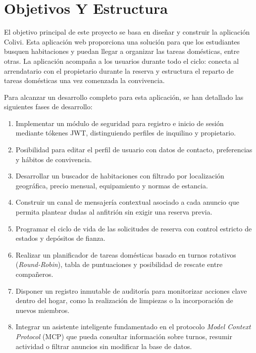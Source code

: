\section{Objetivos Y Estructura}
\label{Objetivos Y Estructura}

    El objetivo principal de este proyecto se basa en diseñar y construir la aplicación Colivi. Esta aplicación web proporciona una solución para que los estudiantes busquen habitaciones y puedan llegar a organizar las tareas domésticas, entre otras. La aplicación acompaña a los usuarios durante todo el ciclo: conecta al arrendatario con el propietario durante la reserva y estructura el reparto de tareas domésticas una vez comenzada la convivencia.
    
    Para alcanzar un desarrollo completo para esta aplicación, se han detallado las siguientes fases de desarrollo: 

\begin{enumerate}
    \item Implementar un módulo de seguridad para registro e inicio de sesión mediante tókenes JWT, distinguiendo perfiles de inquilino y propietario.
    \item Posibilidad para editar el perfil de usuario con datos de contacto, preferencias y hábitos de convivencia.
    \item Desarrollar un buscador de habitaciones con filtrado por localización geográfica, precio mensual, equipamiento y normas de estancia.
    \item Construir un canal de mensajería contextual asociado a cada anuncio que permita plantear dudas al anfitrión sin exigir una reserva previa.
    \item Programar el ciclo de vida de las solicitudes de reserva con control estricto de estados y depósitos de fianza.
    \item Realizar un planificador de tareas domésticas basado en turnos rotativos (\emph{Round-Robin}), tabla de puntuaciones y posibilidad de rescate entre compañeros.
    \item Disponer un registro inmutable de auditoría para monitorizar acciones clave dentro del hogar, como la realización de limpiezas o la incorporación de nuevos miembros.
    \item Integrar un asistente inteligente fundamentado en el protocolo \emph{Model Context Protocol} (MCP) que pueda consultar información sobre turnos, resumir actividad o filtrar anuncios sin modificar la base de datos.
\end{enumerate}

